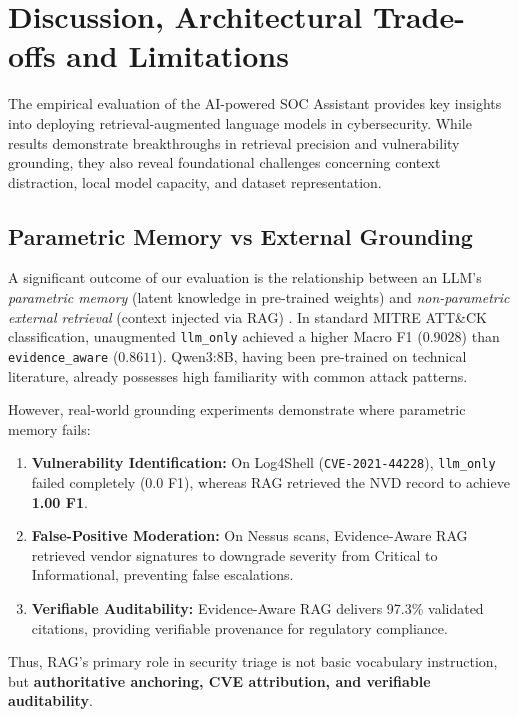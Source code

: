 \chapter{Discussion, Architectural Trade-offs and Limitations}
\label{chap:limitations_future_work}

The empirical evaluation of the AI-powered SOC Assistant provides key insights into deploying retrieval-augmented language models in cybersecurity. While results demonstrate breakthroughs in retrieval precision and vulnerability grounding, they also reveal foundational challenges concerning context distraction, local model capacity, and dataset representation.

\section{Parametric Memory vs External Grounding}
\label{sec:discussion_findings}
A significant outcome of our evaluation is the relationship between an LLM's \textit{parametric memory} (latent knowledge in pre-trained weights) and \textit{non-parametric external retrieval} (context injected via RAG) \cite{lewis2020rag}. In standard MITRE ATT\&CK classification, unaugmented \texttt{llm\_only} achieved a higher Macro F1 ($0.9028$) than \texttt{evidence\_aware} ($0.8611$). Qwen3:8B, having been pre-trained on technical literature, already possesses high familiarity with common attack patterns.

However, real-world grounding experiments demonstrate where parametric memory fails:
\begin{enumerate}[itemsep=1pt,topsep=2pt]
    \item \textbf{Vulnerability Identification:} On Log4Shell (\texttt{CVE-2021-44228}), \texttt{llm\_only} failed completely ($0.0$ F1), whereas RAG retrieved the NVD record to achieve \textbf{1.00 F1}.
    \item \textbf{False-Positive Moderation:} On Nessus scans, Evidence-Aware RAG retrieved vendor signatures to downgrade severity from Critical to Informational, preventing false escalations.
    \item \textbf{Verifiable Auditability:} Evidence-Aware RAG delivers 97.3\% validated citations, providing verifiable provenance for regulatory compliance.
\end{enumerate}
Thus, RAG's primary role in security triage is not basic vocabulary instruction, but \textbf{authoritative anchoring, CVE attribution, and verifiable auditability}.

